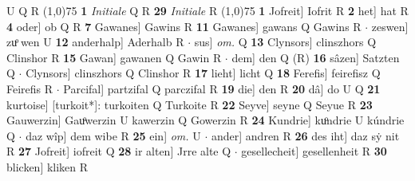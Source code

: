 \documentclass[8pt,a4paper,notitlepage]{article}
\begin{document}
\begin{table}[ht]
\begin{minipage}[t]{0.5\linewidth}
U Q R \newline
\line(1,0){75} \newline
\textbf{1} \textit{Initiale} Q R  \textbf{29} \textit{Initiale} R  \newline
\line(1,0){75} \newline
\textbf{1} Jofreit] Iofrit R \textbf{2} het] hat R \textbf{4} oder] ob Q R \textbf{7} Gawanes] Gawins R \textbf{11} Gawanes] gawans Q Gawins R  $\cdot$ zeswen] zuͦ wen U \textbf{12} anderhalp] Aderhalb R  $\cdot$ sus] \textit{om.} Q \textbf{13} Clynsors] clinszhors Q Clinshor R \textbf{15} Gawan] gawanen Q Gawin R  $\cdot$ dem] den Q (R) \textbf{16} sâzen] Satzten Q  $\cdot$ Clynsors] clinszhors Q Clinshor R \textbf{17} lieht] licht Q \textbf{18} Ferefis] feirefisz Q Feirefis R  $\cdot$ Parcifal] partzifal Q parczifal R \textbf{19} die] den R \textbf{20} dâ] do U Q \textbf{21} kurtoise] [turkoit*]: turkoiten Q Turkoite R \textbf{22} Seyve] seyne Q Seyue R \textbf{23} Gauwerzin] Gauͦwerzin U kawerzin Q Gowerzin R \textbf{24} Kundrie] kuͦndrie U kúndrie Q  $\cdot$ daz wîp] dem wibe R \textbf{25} ein] \textit{om.} U  $\cdot$ ander] andren R \textbf{26} des iht] daz sẏ nit R \textbf{27} Jofreit] iofreit Q \textbf{28} ir alten] Jrre alte Q  $\cdot$ gesellecheit] gesellenheit R \textbf{30} blicken] kliken R \newline
\end{minipage}
\end{table}
\end{document}
